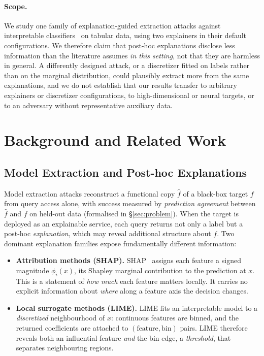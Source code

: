 \documentclass[sigconf,anonymous,review]{acmart}
\begin{document}
\paragraph{Scope.} We study one family of explanation-guided extraction attacks against interpretable
classifiers~\cite{oksuz2024autolycus} on tabular data, using two explainers in their default
configurations. We therefore claim that post-hoc explanations disclose less information than the
literature assumes \emph{in this setting}, not that they are harmless in general. A differently
designed attack, or a discretizer fitted on labels rather than on the marginal distribution, could
plausibly extract more from the same explanations, and we do not establish that our results transfer
to arbitrary explainers or discretizer configurations, to high-dimensional or neural targets, or to
an adversary without representative auxiliary data.

\section{Background and Related Work}
\label{sec:background}

\subsection{Model Extraction and Post-hoc Explanations}
\label{subsec:prelim}

Model extraction attacks reconstruct a functional copy $\hat{f}$ of a black-box
target $f$ from query access alone, with success measured by \emph{prediction
agreement} between $\hat{f}$ and $f$ on held-out data (formalised in
\S\ref{sec:problem}). When the target is deployed as an explainable service, each
query returns not only a label but a post-hoc \emph{explanation}, which may reveal
additional structure about $f$. Two dominant explanation families expose
fundamentally different information:

\begin{itemize}
  \item \textbf{Attribution methods (SHAP).} SHAP~\cite{lundberg2017shap} assigns
  each feature a signed magnitude $\phi_i(x)$, its Shapley marginal contribution
  to the prediction at $x$. This is a statement of \emph{how much} each feature matters locally. It carries no explicit information about \emph{where} along a
  feature axis the decision changes.
  \item \textbf{Local surrogate methods (LIME).} LIME fits an interpretable model
  to a \emph{discretized} neighbourhood of $x$: continuous features are binned, and
  the returned coefficients are attached to $(\text{feature}, \text{bin})$ pairs.
  LIME therefore reveals both an influential feature \emph{and} the bin edge, a \emph{threshold}, that separates neighbouring regions.
\end{itemize}
\end{document}
